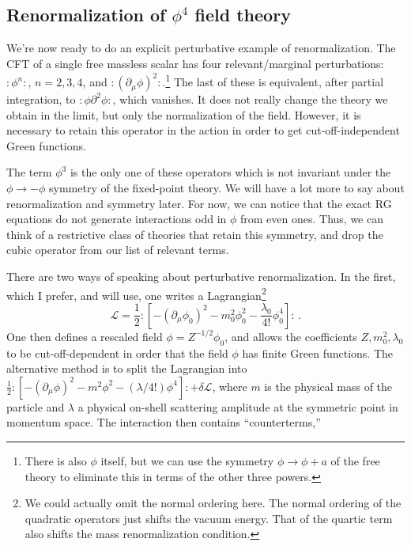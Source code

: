 \subsection{Renormalization of $\phi^4$ field theory}

We're now ready to do an explicit perturbative example of renormalization. The
CFT of a single free massless scalar has four relevant/marginal perturbations:
$:\phi^n:$, $n=2,3,4$, and $:(\partial_\mu\phi)^2:$.\footnote[8]{There is also
$\phi$ itself, but we can use the symmetry $\phi\to\phi+a$ of the free theory to
eliminate this in terms of the other three powers.} The last of these is
equivalent, after partial integration, to $:\phi\partial^2\phi:$, which
vanishes. It does not really change the theory we obtain in the limit, but only
the normalization of the field. However, it is necessary to retain this operator
in the action in order to get cut-off-independent Green functions.

The term $\phi^3$ is the only one of these operators which is not invariant under
the $\phi\to-\phi$ symmetry of the fixed-point theory. We will have a lot more
to say about renormalization and symmetry later. For now, we can notice that the
exact RG equations do not generate interactions odd in $\phi$ from even ones.
Thus, we can think of a restrictive class of theories that retain this symmetry,
and drop the cubic operator from our list of relevant terms.

There are two ways of speaking about perturbative renormalization. In the first,
which I prefer, and will use, one writes a Lagrangian\footnote[9]{We could
actually omit the normal ordering here. The normal ordering of the quadratic
operators just shifts the vacuum energy. That of the quartic term also shifts the
mass renormalization condition.}
\[
  \mathcal{L}=\frac{1}{2}:\!\left[-(\partial_\mu\phi_0)^2-m_0^2\phi_0^2
  -\frac{\lambda_0}{4!}\phi_0^4\right]\!:\,.
\]
One then defines a rescaled field $\phi=Z^{-1/2}\phi_0$, and allows the
coefficients $Z,m_0^2,\lambda_0$ to be cut-off-dependent in order that the field
$\phi$ has finite Green functions. The alternative method is to split the
Lagrangian into $\frac12:[-(\partial_\mu\phi)^2-m^2\phi^2-(\lambda/4!)\phi^4]:
+\delta\mathcal{L}$, where $m$ is the physical mass of the particle and $\lambda$
a physical on-shell scattering amplitude at the symmetric point in momentum
space. The interaction then contains ``counterterms,''

